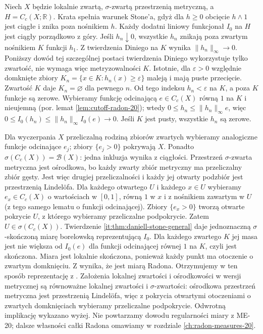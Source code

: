 \begin{przyklad}[Zastosowanie do $C_c(X)$]
\label{it:ex:daniell-cc}
Niech $X$ będzie lokalnie zwartą, $\sigma$-zwartą
przestrzenią metryczną, a $H=C_c(X;\mathbb{R})$.
Krata spełnia warunek Stone'a, gdyż dla $h\ge0$
obcięcie $h\wedge1$ jest ciągłe i znika poza nośnikiem $h$.
Każdy dodatni liniowy funkcjonał $I_0$ na $H$
jest ciągły porządkowo z góry. Jeśli $h_n\downarrow0$,
wszystkie $h_n$ znikają poza zwartym nośnikiem $K$
funkcji $h_1$. Z twierdzenia Diniego na $K$ wynika
$\|h_n\|_\infty\to0$. Poniższy dowód tej szczególnej
postaci twierdzenia Diniego wykorzystuje tylko zwartość,
nie wymaga więc metryzowalności $K$. Istotnie, dla $\varepsilon>0$
względnie domknięte zbiory
$K_n=\{x\in K:h_n(x)\ge\varepsilon\}$ maleją
i mają puste przecięcie. Zwartość $K$ daje
$K_n=\varnothing$ dla pewnego $n$. Od tego indeksu
$h_n<\varepsilon$ na $K$, a poza $K$ funkcje są zerowe. Wybieramy funkcję odcinającą
$e\in C_c(X)$ równą $1$ na $K$ i nieujemną
(por. lemat \ref{lem:cutoff-radon-20}); wtedy
$0\le h_n\le\|h_n\|_\infty e$, więc
$0\le I_0(h_n)\le\|h_n\|_\infty I_0(e)\to0$.
Jeśli $K$ jest pusty, wszystkie $h_n$ są zerowe.

Dla wyczerpania $X$ przeliczalną rodziną zbiorów
zwartych wybieramy analogiczne funkcje odcinające
$e_j$; zbiory $\{e_j>0\}$ pokrywają $X$.
Ponadto $\sigma(C_c(X))=\mathcal B(X)$:
jedna inkluzja wynika z ciągłości. Przestrzeń
$\sigma$-zwarta metryczna jest ośrodkowa, bo każdy
zwarty zbiór metryczny ma przeliczalny zbiór gęsty.
Jest więc drugiej przeliczalności i każdy jej otwarty
podzbiór jest przestrzenią Lindelöfa.
Dla każdego otwartego $U$ i każdego $x\in U$
wybieramy $e_x\in C_c(X)$ o wartościach w $[0,1]$,
równą $1$ w $x$ i z nośnikiem zawartym w $U$
(z tego samego lematu o funkcji odcinającej).
Zbiory $\{e_x>0\}$ tworzą otwarte pokrycie $U$,
z którego wybieramy przeliczalne podpokrycie.
Zatem $U\in\sigma(C_c(X))$.
Twierdzenie \ref{it:thm:daniell-stone-general}
daje jednoznaczną $\sigma$-skończoną miarę borelowską
reprezentującą $I_0$. Dla każdego zwartego $K$
jej masa jest nie większa od $I_0(e)$ dla funkcji
odcinającej równej $1$ na $K$, czyli jest skończona.
Miara jest lokalnie skończona, ponieważ każdy punkt
ma otoczenie o zwartym domknięciu. Z
wynika, że jest miarą Radona. Otrzymujemy w ten sposób
reprezentację z .
Założenia lokalnej zwartości i ośrodkowości w wersji
metrycznej są równoważne lokalnej zwartości i
$\sigma$-zwartości: ośrodkowa przestrzeń metryczna
jest przestrzenią Lindelöfa, więc z pokrycia otwartymi
otoczeniami o zwartych domknięciach wybieramy
przeliczalne podpokrycie. Odwrotną implikację wykazano
wyżej. Nie powtarzamy dowodu regularności miary
z ME-20; dalsze własności całki Radona omawiamy
w rozdziale \ref{ch:radon-measures-20}.
\end{przyklad}

